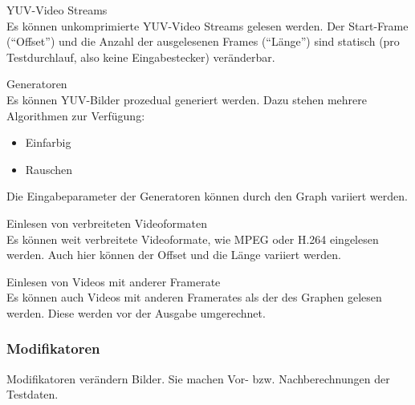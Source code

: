 \begin{speclist}[F]
\setcounter{specnum}{21010}

\spec YUV-Video Streams \\
Es können unkomprimierte YUV-Video Streams gelesen werden. Der Start-Frame ("`Offset"') und die Anzahl der ausgelesenen Frames ("`Länge"') sind statisch (pro Testdurchlauf, also keine Eingabestecker) veränderbar.

\spec Generatoren \\
Es können YUV-Bilder prozedual generiert werden. Dazu stehen mehrere Algorithmen zur Verfügung:
\begin{itemize}
	\item Einfarbig
	\item Rauschen
\end{itemize}
Die Eingabeparameter der Generatoren können durch den Graph variiert werden.

\optspec Einlesen von verbreiteten Videoformaten \\
Es können weit verbreitete Videoformate, wie MPEG oder H.264 eingelesen werden. Auch hier können der Offset und die Länge variiert werden.

\optspec Einlesen von Videos mit anderer Framerate \\
Es können auch Videos mit anderen Framerates als der des Graphen gelesen werden. Diese werden vor der Ausgabe umgerechnet.

\end{speclist}

\subsubsection{Modifikatoren}
Modifikatoren verändern Bilder. Sie machen Vor- bzw. Nachberechnungen der Testdaten.

